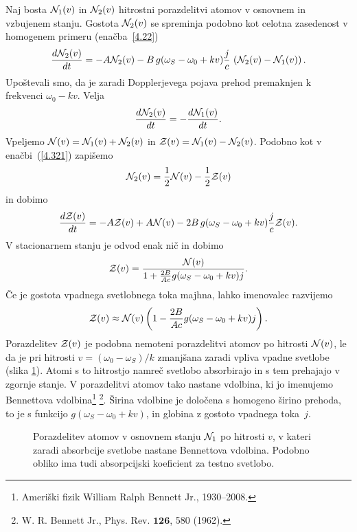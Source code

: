 Naj bosta ${\cal N}_{1}(v)$ in ${\cal N}_{2}(v)$ hitrostni porazdelitvi
atomov v osnovnem in vzbujenem stanju. Gostota
${\cal N}_{2}(v)$ se spreminja podobno kot celotna
zasedenost v homogenem primeru (enačba~\ref{4.22})
\begin{equation}
\frac{d{\cal N}_{2}(v)}{dt}=-A{\cal N}_{2}(v) -B\, g(\omega_S-\omega_{0}+kv)
\frac{j}{c}\,
\left({\cal N}_{2}(v)-{\cal N}_{1}(v)\right).
\label{4.85}
\end{equation}
Upoštevali smo, da je zaradi Dopplerjevega pojava prehod premaknjen k frekvenci
$\omega_{0}-kv$. Velja
\begin{equation}
 \frac{d{\cal N}_{2}(v)}{dt}=-\frac{d{\cal N}_{1}(v)}{dt}.
\label{4.86}
\end{equation}
Vpeljemo ${\cal N}(v)={\cal N}_{1}(v)+{\cal N}_{2}(v)$ in 
${\cal Z}(v)={\cal N}_{1}(v)-{\cal N}_{2}(v)$. Podobno kot 
v enačbi~(\ref{4.321}) zapišemo
\begin{equation}
{\cal N}_{2}(v)=\frac{1}{2}{\cal N}(v)-\frac{1}{2}{\cal Z}(v)
\end{equation}
in dobimo 
\begin{equation}
\frac{d{\cal Z}(v)}{dt}=-A{\cal Z}(v)+A{\cal N}(v)
-2B\,g(\omega_S-\omega_{0}+kv)\frac{j}{c}
{\cal Z}(v).
\label{4.87}
\end{equation}
V stacionarnem stanju je odvod enak nič in dobimo
\begin{equation}
{\cal Z}(v)=\frac{{\cal N}(v)}{1+\frac{2B}{Ac}g(\omega_S-\omega_{0}+kv)j}.
\label{4.88}
\end{equation}
 Če je gostota vpadnega svetlobnega toka majhna, lahko imenovalec razvijemo
\begin{equation}
{\cal Z}(v)\approx{\cal N}(v)\left(1-\frac{2B}{Ac}g(\omega_S-\omega_{0}+kv)j\right).
\label{4.89}
\end{equation}
Porazdelitev ${\cal Z}(v)$ je podobna nemoteni porazdelitvi atomov
po hitrosti ${\cal N}(v)$, le da je pri hitrosti $v=(\omega_{0}-\omega_S)/k$
zmanjšana zaradi vpliva vpadne svetlobe (slika \ref{fig:Bennet}). 
Atomi s to hitrostjo namreč svetlobo
absorbirajo in s tem prehajajo v zgornje stanje. V porazdelitvi
atomov tako nastane vdolbina, ki jo imenujemo
Bennettova vdolbina\footnote{Ameriški fizik William Ralph Bennett Jr., 1930--2008.} 
\footnote{W. R. Bennett Jr., Phys. Rev. $\mathbf{126}$, 580 (1962).}.
Širina vdolbine je določena
s homogeno širino prehoda, to je s funkcijo $g(\omega_S-\omega_{0}+kv)$, in 
globina  z gostoto vpadnega toka~$j$.
\begin{figure}[h]
\centering
\def\svgwidth{90truemm} 

\caption{Porazdelitev atomov v osnovnem stanju ${\cal N}_1$ po hitrosti $v$, v kateri zaradi
absorbcije svetlobe nastane Bennettova vdolbina. Podobno obliko ima 
tudi absorpcijski koeficient za testno svetlobo.}
\label{fig:Bennet}
\end{figure}

